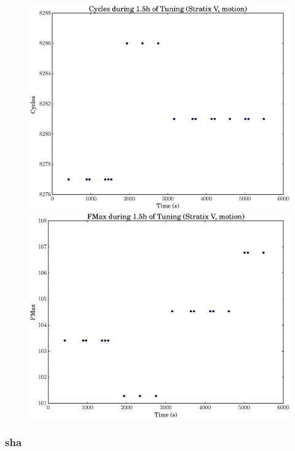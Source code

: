 \documentclass[12pt, a4paper]{article}
\begin{document}
\begin{figure}[htpb]
    \begin{minipage}{.48\textwidth}
        \includegraphics[scale=.25]{motion_cycles_5400_chstone_StratixV}
    \end{minipage}%
    \hfill
    \begin{minipage}{.48\textwidth}
        \includegraphics[scale=.25]{motion_fmax_5400_chstone_StratixV}
    \end{minipage}%
\end{figure}

\newpage

\subsubsection{sha}
\end{document}
